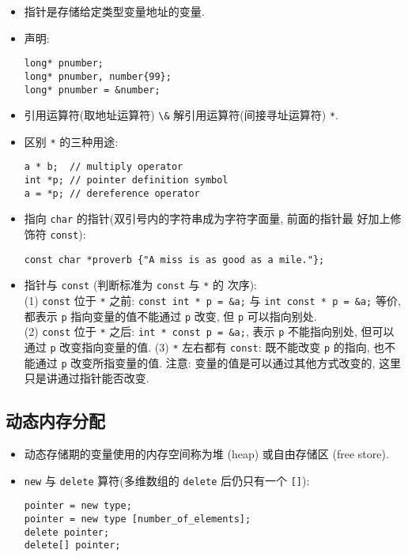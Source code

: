 \documentclass[a4paper,UTF8]{ctexart}
\begin{document}
\begin{itemize}[leftmargin=0pt, rightmargin=0cm, labelwidth=0.8cm, labelsep=0.2cm]
\item 指针是存储给定类型变量地址的变量.
\item 声明:
\begin{lstlisting}
long* pnumber;
long* pnumber, number{99};
long* pnumber = &number;
\end{lstlisting}
\item 引用运算符(取地址运算符) \lstinline{\&} \quad 解引用运算符(间接寻址运算符)
  \lstinline{*}.
\item 区别 \lstinline{*} 的三种用途:
\begin{lstlisting}
a * b;  // multiply operator
int *p; // pointer definition symbol
a = *p; // dereference operator
\end{lstlisting}
\item 指向 \lstinline{char} 的指针(双引号内的字符串成为字符字面量, 前面的指针最
  好加上修饰符 \lstinline{const}):
\begin{lstlisting}
const char *proverb {"A miss is as good as a mile."};
\end{lstlisting}
\item 指针与 \lstinline{const} (判断标准为 \lstinline{const} 与 \lstinline{*} 的
  次序):\\
(1) \lstinline{const} 位于 \lstinline{*} 之前: \lstinline{const int * p = &a;}
与 \lstinline{int const * p = &a;} 等价, 都表示 \lstinline{p} 指向变量的值不能通过
\lstinline{p} 改变, 但 \lstinline{p} 可以指向别处.\\
(2) \lstinline{const} 位于 \lstinline{*} 之后: \lstinline{int * const p = &a;},
表示 \lstinline{p} 不能指向别处, 但可以通过 \lstinline{p} 改变指向变量的值.
(3) \lstinline{*} 左右都有 \lstinline{const}: 既不能改变 \lstinline{p} 的指向,
也不能通过 \lstinline{p} 改变所指变量的值.
注意: 变量的值是可以通过其他方式改变的, 这里只是讲通过指针能否改变.
\end{itemize}

\subsection{动态内存分配}

\begin{itemize}[leftmargin=0pt, rightmargin=0cm, labelwidth=0.8cm, labelsep=0.2cm]
\item 动态存储期的变量使用的内存空间称为堆 (heap) 或自由存储区 (free store).
\item \lstinline{new} 与 \lstinline{delete} 算符(多维数组的
  \lstinline{delete} 后仍只有一个 \lstinline{[]}):
\begin{lstlisting}
pointer = new type;
pointer = new type [number_of_elements];
delete pointer;
delete[] pointer;
\end{lstlisting}
\end{itemize}
\end{document}
